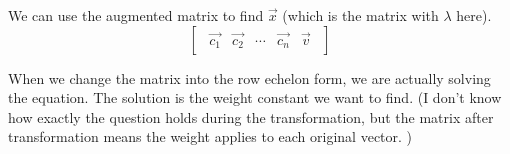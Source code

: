\documentclass[oneside]{book}
\begin{document}
We can use the augmented matrix to find $\vec{x}$ (which is the matrix with $\lambda$ here).
\[
    \begin{bmatrix}
        \begin{array}{cccc|c}
            \vec{c_1} & \vec{c_2} & \cdots & \vec{c_n} & \vec{v}
        \end{array}
    \end{bmatrix}
\]

When we change the matrix into the row echelon form, we are actually solving the equation. The solution is the weight constant we want to find. (I don't know how exactly the question holds during the transformation, but the matrix after transformation means the weight applies to each original vector. )

\end{document}
